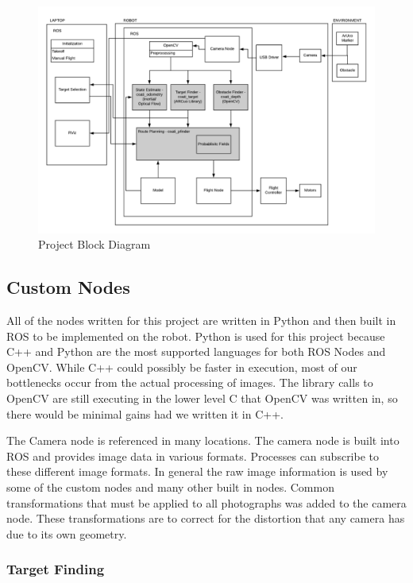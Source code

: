 \documentclass{article}[12]
\begin{document}
	\begin{figure}[H]
		\centering
		\includegraphics[width=\linewidth]{BlockDiagram}
		\caption{Project Block Diagram}
		\label{fig:blockdiagram}
	\end{figure}

	\subsection{Custom Nodes}
	
 All of the nodes written for this project are written in Python and then built in ROS to be implemented on the robot. Python is used for this project because C++ and Python are the most supported languages for both ROS Nodes and OpenCV. While C++ could possibly be faster in execution, most of our bottlenecks occur from the actual processing of images. The library calls to OpenCV are still executing in the lower level C that OpenCV was written in, so there would be minimal gains had we written it in C++.
 
 The Camera node is referenced in many locations. The camera node is built into ROS and provides image data in various formats. Processes can subscribe to these different image formats. In general the raw image information is used by some of the custom nodes and many other built in nodes. Common transformations that must be applied to all photographs was added to the camera node. These transformations are to correct for the distortion that any camera has due to its own geometry.
	
	\subsubsection{Target Finding}
	
\end{document}

